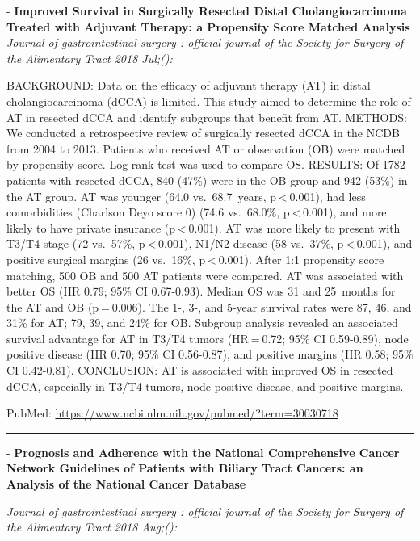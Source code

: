 \documentclass[]{article}
\begin{document}
 - \textbf{Improved Survival in Surgically Resected Distal
Cholangiocarcinoma Treated with Adjuvant Therapy: a Propensity Score
Matched Analysis} \emph{Journal of gastrointestinal surgery : official
journal of the Society for Surgery of the Alimentary Tract 2018 Jul;():}

BACKGROUND: Data on the efficacy of adjuvant therapy (AT) in distal
cholangiocarcinoma (dCCA) is limited. This study aimed to determine the
role of AT in resected dCCA and identify subgroups that benefit from AT.
METHODS: We conducted a retrospective review of surgically resected dCCA
in the NCDB from 2004 to 2013. Patients who received AT or observation
(OB) were matched by propensity score. Log-rank test was used to compare
OS. RESULTS: Of 1782 patients with resected dCCA, 840 (47\%) were in the
OB group and 942 (53\%) in the AT group. AT was younger (64.0
vs.~68.7~years, p \textless{} 0.001), had less comorbidities (Charlson
Deyo score 0) (74.6 vs.~68.0\%, p \textless{} 0.001), and more likely to
have private insurance (p \textless{} 0.001). AT was more likely to
present with T3/T4 stage (72 vs.~57\%, p \textless{} 0.001), N1/N2
disease (58 vs.~37\%, p \textless{} 0.001), and positive surgical
margins (26 vs.~16\%, p \textless{} 0.001). After 1:1 propensity score
matching, 500 OB and 500 AT patients were compared. AT was associated
with better OS (HR 0.79; 95\% CI 0.67-0.93). Median OS was 31 and
25~months for the AT and OB (p = 0.006). The 1-, 3-, and 5-year survival
rates were 87, 46, and 31\% for AT; 79, 39, and 24\% for OB. Subgroup
analysis revealed an associated survival advantage for AT in T3/T4
tumors (HR = 0.72; 95\% CI 0.59-0.89), node positive disease (HR 0.70;
95\% CI 0.56-0.87), and positive margins (HR 0.58; 95\% CI 0.42-0.81).
CONCLUSION: AT is associated with improved OS in resected dCCA,
especially in T3/T4 tumors, node positive disease, and positive margins.

PubMed: \url{https://www.ncbi.nlm.nih.gov/pubmed/?term=30030718}

{}

{}

\begin{center}\rule{0.5\linewidth}{\linethickness}\end{center}

 - \textbf{Prognosis and Adherence with the National Comprehensive
Cancer Network Guidelines of Patients with Biliary Tract Cancers: an
Analysis of the National Cancer Database}

\emph{Journal of gastrointestinal surgery : official journal of the
Society for Surgery of the Alimentary Tract 2018 Aug;():}
\end{document}
